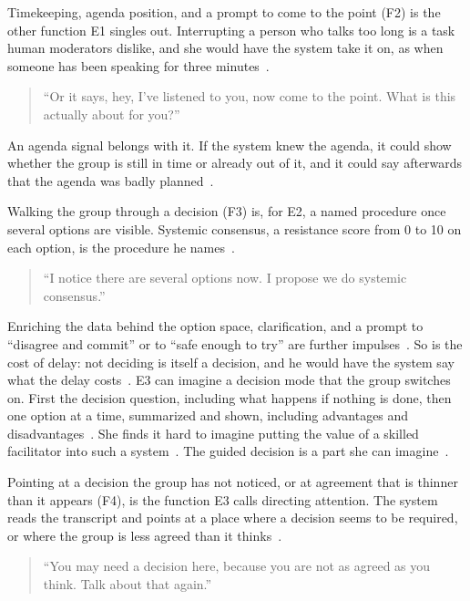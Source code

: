 Timekeeping, agenda position, and a prompt to come to the point (F2) is the other function
E1 singles out.
Interrupting a person who talks too long is a task human moderators dislike, and she would
have the system take it on, as when someone has been speaking for three
minutes~.
{\setlength{\topsep}{0.25\baselineskip}\setlength{\partopsep}{0pt}%
  \begin{quote}\small
    \enquote{Or it says, hey, I've listened to you, now come to the point. What is this actually
    about for you?}~
\end{quote}}
An agenda signal belongs with it.
If the system knew the agenda, it could show whether the group is still in time or already
out of it, and it could say afterwards that the agenda was badly planned~.

Walking the group through a decision (F3) is, for E2, a named procedure once several options
are visible.
Systemic consensus, a resistance score from 0 to 10 on each option, is the procedure he
names~.
{\setlength{\topsep}{0.25\baselineskip}\setlength{\partopsep}{0pt}%
  \begin{quote}\small
    \enquote{I notice there are several options now. I propose we do systemic consensus.}~
\end{quote}}
Enriching the data behind the option space, clarification, and a prompt to ``disagree and
commit'' or to ``safe enough to try'' are further impulses~.
So is the cost of delay: not deciding is itself a decision, and he would have the system say
what the delay costs~.
E3 can imagine a decision mode that the group switches on.
First the decision question, including what happens if nothing is done, then one option at a
time, summarized and shown, including advantages and disadvantages~.
She finds it hard to imagine putting the value of a skilled facilitator into such a
system~.
The guided decision is a part she can imagine~.

Pointing at a decision the group has not noticed, or at agreement that is thinner than it
appears (F4), is the function E3 calls directing attention.
The system reads the transcript and points at a place where a decision seems to be required,
or where the group is less agreed than it thinks~.
{\setlength{\topsep}{0.25\baselineskip}\setlength{\partopsep}{0pt}%
  \begin{quote}\small
    \enquote{You may need a decision here, because you are not as agreed as you think. Talk about
    that again.}~
\end{quote}}

